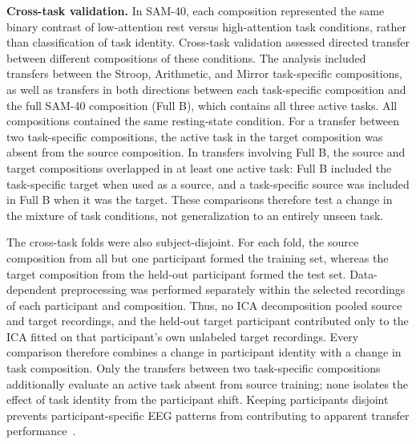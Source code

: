 \documentclass[10pt,letterpaper]{article}
\newcommand{\rev}[1]{#1}
\begin{document}
\textbf{Cross-task validation.}
\rev{In SAM-40, each composition represented the same binary contrast of
low-attention rest versus high-attention task conditions, rather than
classification of task identity. Cross-task validation assessed directed
transfer between different compositions of these conditions. The analysis
included transfers between the Stroop, Arithmetic, and Mirror task-specific
compositions, as well as transfers in both directions between each
task-specific composition and the full SAM-40 composition (Full B), which
contains all three active tasks. All compositions contained the same
resting-state condition. For a transfer between two task-specific compositions,
the active task in the target composition was absent from the source
composition. In transfers involving Full B, the source and target compositions
overlapped in at least one active task: Full B included the task-specific
target when used as a source, and a task-specific source was included in Full B
when it was the target. These comparisons therefore test a change in the
mixture of task conditions, not generalization to an entirely unseen task.}

\rev{The cross-task folds were also subject-disjoint. For each fold, the source
composition from all but one participant formed the training set, whereas the
target composition from the held-out participant formed the test set.
Data-dependent preprocessing was performed separately within the selected
recordings of each participant and composition. Thus, no ICA decomposition
pooled source and target recordings, and the held-out target participant
contributed only to the ICA fitted on that participant's own unlabeled target
recordings. Every comparison therefore combines a change in participant
identity with a change in task composition. Only the transfers between two
task-specific compositions additionally evaluate an active task absent from
source training; none isolates the effect of task identity from the participant
shift. Keeping participants disjoint prevents participant-specific EEG
patterns from contributing to apparent transfer performance~\cite{kamrud2021vigilance,ke2021crosstask}.}
\end{document}
